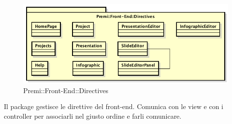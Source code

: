 \begin{figure}[h]
	\centering
	\includegraphics[width=0.7\linewidth]{img/premi_front_end_directives}
	\caption[Premi::Front-End::Directives]{Premi::Front-End::Directives}
\end{figure}
Il package gestisce le direttive del front-end. Comunica con le view e con i controller per associarli nel giusto ordine e farli comunicare. 